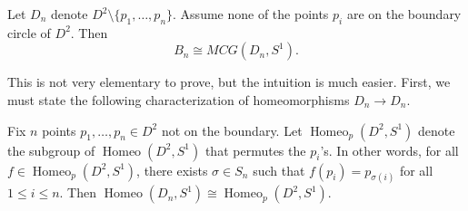 \documentclass{amsart}
\DeclareMathOperator{\Homeo}{Homeo}
\begin{document}
\begin{theorem}
	Let \(D_n\) denote \(D^2\setminus\{p_1, \ldots, p_n\}\). Assume none of the
	points \(p_i\) are on the boundary circle of \(D^2\). Then 
	\[
	   B_n\cong MCG(D_n, S^1).
	\]
\end{theorem}
This is not very elementary to prove, but the intuition is much easier. First,
we must state the following characterization of homeomorphisms \(D_n\to D_n\).
\begin{proposition}\label{puncture-markedpoints}
	Fix \(n\) points \(p_1,\ldots, p_n\in D^2\) not on the boundary. Let
	\(\Homeo_p(D^2, S^1)\) denote the subgroup of \(\Homeo(D^2, S^1)\) that
	permutes the \(p_i\)'s. In other words, for all \(f\in\Homeo_p(D^2, S^1)\),
	there exists \(\sigma\in S_n\) such that \(f(p_i) = p_{\sigma(i)}\) for all
	\(1\le i\le n\). Then \(\Homeo(D_n, S^1)\cong \Homeo_p(D^2, S^1)\).
\end{proposition}
\end{document}
